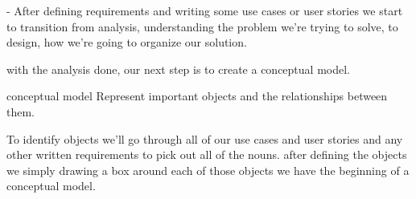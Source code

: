 - After defining requirements and writing some use cases or user stories we start to transition from analysis, 
understanding the problem we're trying to solve, to design, how we're going to organize our solution. 

with the analysis done, our next step is to create a conceptual model.

conceptual model 
  Represent important objects and the relationships between them.

To identify objects
  we'll go through all of our use cases and user stories and any other written requirements 
  to pick out all of the nouns.
  after defining the objects we simply drawing a box around each of those objects we have the beginning of a conceptual model.

